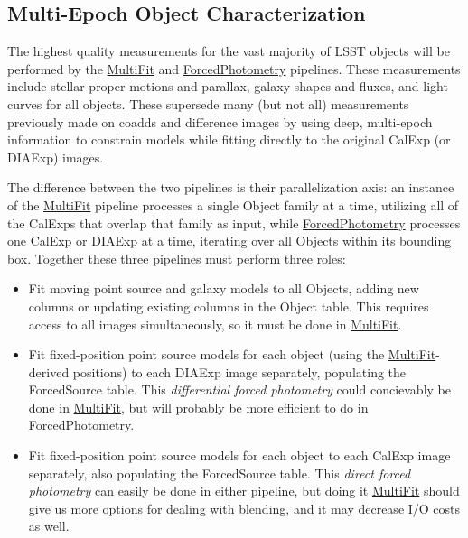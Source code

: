 \subsection{Multi-Epoch Object Characterization}
\label{sec:drp_multi_epoch_object_characterization}

The highest quality measurements for the vast majority of LSST objects will be performed by the \hyperref[sec:drpMultiFit]{MultiFit} and \hyperref[sec:drpForcedPhotometry]{ForcedPhotometry} pipelines.   These measurements include stellar proper motions and parallax, galaxy shapes and fluxes, and light curves for all objects.  These supersede many (but not all) measurements previously made on coadds and difference images by using deep, multi-epoch information to constrain models while fitting directly to the original CalExp (or DIAExp) images.

The difference between the two pipelines is their parallelization axis: an instance of the \hyperref[sec:drpMultiFit]{MultiFit} pipeline processes a single Object family at a time, utilizing all of the CalExps that overlap that family as input, while \hyperref[sec:drpForcedPhotometry]{ForcedPhotometry} processes one CalExp or DIAExp at a time, iterating over all Objects within its bounding box.  Together these three pipelines must perform three roles:
\begin{itemize}
\item Fit moving point source and galaxy models to all Objects, adding new columns or updating existing columns in the Object table.  This requires access to all images simultaneously, so it must be done in \hyperref[sec:drpMultiFit]{MultiFit}.
\item Fit fixed-position point source models for each object (using the \hyperref[sec:drpMultiFit]{MultiFit}-derived positions) to each DIAExp image separately, populating the ForcedSource table.  This \emph{differential forced photometry} could concievably be done in \hyperref[sec:drpMultiFit]{MultiFit}, but will probably be more efficient to do in \hyperref[sec:drpForcedPhotometry]{ForcedPhotometry}.
\item Fit fixed-position point source models for each object to each CalExp image separately, also populating the ForcedSource table.  This \emph{direct forced photometry} can easily be done in either pipeline, but doing it \hyperref[sec:drpMultiFit]{MultiFit} should give us more options for dealing with blending, and it may decrease I/O costs as well.
\end{itemize}

